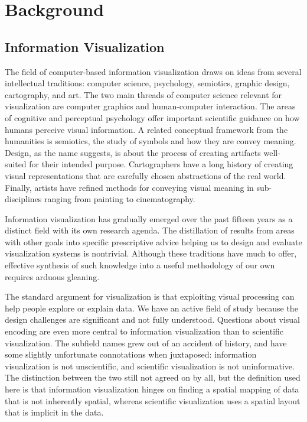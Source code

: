 \section{Background}
\label{sec:background}


\subsection{Information Visualization}
\label{sec:infovis}

The field of computer-based information visualization draws on ideas from several intellectual traditions: computer science, psychology, semiotics, graphic design, cartography, and art.
The two main threads of computer science relevant for visualization are computer graphics and human-computer interaction.
The areas of cognitive and perceptual psychology offer important scientific guidance on how humans perceive visual information.
A related conceptual framework from the humanities is semiotics, the study of symbols and how they are convey meaning.
Design, as the name suggests, is about the process of creating artifacts well- suited for their intended purpose.
Cartographers have a long history of creating visual representations that are carefully chosen abstractions of the real world.
Finally, artists have refined methods for conveying visual meaning in sub-disciplines ranging from painting to cinematography.

Information visualization has gradually emerged over the past fifteen years as a distinct field with its own research agenda.
The distillation of results from areas with other goals into specific prescriptive advice helping us to design and evaluate visualization systems is nontrivial.
Although these traditions have much to offer, effective synthesis of such knowledge into a useful methodology of our own requires arduous gleaning.

The standard argument for visualization is that exploiting visual processing can help people explore or explain data. We have an active field of study because the design challenges are significant and not fully understood. Questions about visual encoding are even more central to information visualization than to scientific visualization.
The subfield names grew out of an accident of history, and have some slightly unfortunate connotations when juxtaposed: information visualization is not unscientific, and scientific visualization is not uninformative. The distinction between the two still not agreed on by all, but the definition used here is that information visualization hinges on finding a spatial mapping of data that is not inherently spatial, whereas scientific visualization uses a spatial layout that is implicit in the data.

